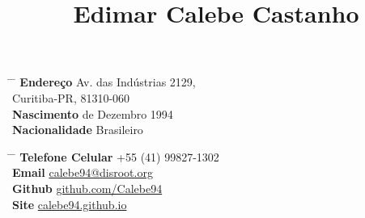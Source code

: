 \documentclass[10pt]{article} %
\begin{document}

\title{Edimar Calebe Castanho} %


\parbox{0.5\textwidth}
{ %
\begin{tabbing} %
\hspace{3cm} \= \hspace{4cm} \= \kill %
{\bf Endereço} \> Av. das Indústrias 2129,\\ %
\> Curitiba-PR, 81310-060 \\ %
{\bf Nascimento}  de Dezembro 1994 \\ %
{\bf Nacionalidade} \> Brasileiro %
\end{tabbing}
}
\hfill %
\parbox{0.5\textwidth}{ %
\begin{tabbing} %
\hspace{3cm} \= \hspace{4cm} \= \kill %
{\bf Telefone Celular} \> +55 (41) 99827-1302 \\ %
{\bf Email} \> \href{mailto:calebe94@disroot.org}{calebe94@disroot.org} \\ %
{\bf Github} \> \href{https://github.com/Calebe94}{github.com/Calebe94} \\ %
{\bf Site} \> \href{https://calebe94.github.io}{calebe94.github.io} %
\end{tabbing}
}



\end{document}
